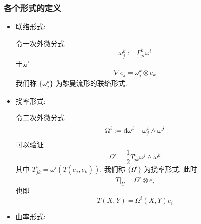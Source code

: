 \documentclass{book}
\newcommand{\md}{{\rm d}}
\newcommand{\lc}[2]{\nabla_{#1}{#2}}
\begin{document}
        \subsubsection{各个形式的定义}
            \begin{itemize}
                \item 联络形式:
                
                令一次外微分式
                \begin{equation*}
                    \omega_{j}^{k} := \Gamma_{ji}^{k}\omega^i
                \end{equation*}
                于是
                \begin{equation*}
                    \lc{}{e_j} = \omega_{j}^{k}\otimes e_k
                \end{equation*}
                我们称 $\{\omega_{j}^{k}\}$ 为黎曼流形的联络形式.
                \item 挠率形式:
                
                令二次外微分式
                \begin{equation*}
                    \Omega^i := \md{\omega^i} + \omega^{i}_{j}\wedge\omega^j
                \end{equation*}
                可以验证
                \begin{equation*}
                    \Omega^i = \frac{1}{2}T_{jk}^{i}\omega^j\wedge\omega^k
                \end{equation*}
                其中 $T_{jk}^{i}=\omega^i\left(T\left(e_j,e_k\right)\right)$, 我们称 $\{\Omega^i\}$ 为挠率形式, 此时
                \begin{equation*}
                    T\big|_U = \Omega^i\otimes e_i
                \end{equation*}
                也即
                \begin{equation*}
                    T(X,Y) = \Omega^i(X,Y)e_i
                \end{equation*}
                \item 曲率形式:
                

\end{itemize}
\end{document}
